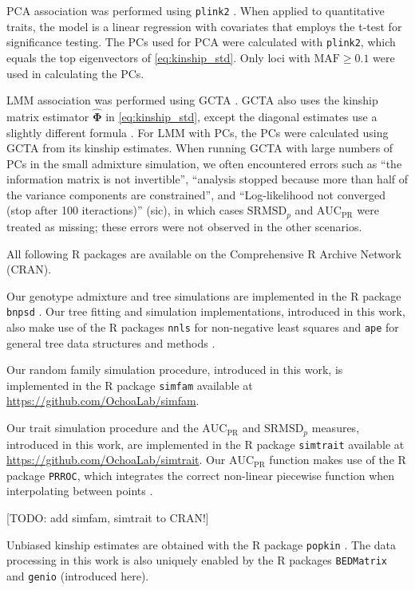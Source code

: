 \documentclass[11pt]{article}
\newcommand{\rmsd}{\text{SRMSD}_p}
\newcommand{\auc}{\text{AUC}_\text{PR}}
\begin{document}
PCA association was performed using \texttt{plink2} \citep{chang_second-generation_2015}.
When applied to quantitative traits, the model is a linear regression with covariates that employs the t-test for significance testing.
The PCs used for PCA were calculated with \texttt{plink2}, which equals the top eigenvectors of \cref{eq:kinship_std}.
Only loci with $\text{MAF} \ge 0.1$ were used in calculating the PCs.

LMM association was performed using GCTA \citep{yang_gcta:_2011}.
GCTA also uses the kinship matrix estimator $\mathbf{\hat{\Phi}}$ in \cref{eq:kinship_std}, except the diagonal estimates use a slightly different formula \citep{yang_gcta:_2011}.
For LMM with PCs, the PCs were calculated using GCTA from its kinship estimates.
When running GCTA with large numbers of PCs in the small admixture simulation, we often encountered errors such as ``the information matrix is not invertible'', ``analysis stopped because more than half of the variance components are constrained'', and ``Log-likelihood not converged (stop after 100 iteractions)'' (sic), in which cases $\rmsd$ and $\auc$ were treated as missing;
these errors were not observed in the other scenarios.

All following R packages are available on the Comprehensive R Archive Network (CRAN).

Our genotype admixture and tree simulations are implemented in the R package \texttt{bnpsd} \citep{ochoa_estimating_2021}.
Our tree fitting and simulation implementations, introduced in this work, also make use of the R packages \texttt{nnls} for non-negative least squares \citep{mullen_nnls_2012} and \texttt{ape} for general tree data structures and methods \citep{paradis_ape_2019}.

Our random family simulation procedure, introduced in this work, is implemented in the R package \texttt{simfam} available at
\url{https://github.com/OchoaLab/simfam}.

Our trait simulation procedure and the $\auc$ and $\rmsd$ measures, introduced in this work, are implemented in the R package \texttt{simtrait} available at
\url{https://github.com/OchoaLab/simtrait}.
Our $\auc$ function makes use of the R package \texttt{PRROC}, which integrates the correct non-linear piecewise function when interpolating between points \citep{grau_prroc:_2015}.

[TODO: add simfam, simtrait to CRAN!]

Unbiased kinship estimates are obtained with the R package \texttt{popkin} \citep{ochoa_estimating_2021}.
The data processing in this work is also uniquely enabled by the R packages \texttt{BEDMatrix} \citep{grueneberg_bgdata_2019} and \texttt{genio} (introduced here).
\end{document}
